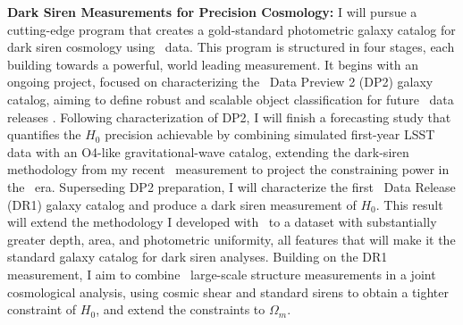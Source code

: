 \textbf{Dark Siren Measurements for Precision Cosmology:}
I will pursue a cutting-edge program that creates a gold-standard photometric galaxy catalog for dark siren cosmology using \LSST\ data.
This program is structured in four stages, each building towards a powerful, world leading measurement.
It begins with an ongoing project, focused on characterizing the \LSST\ Data Preview 2 (DP2) galaxy catalog, aiming to define robust and scalable object classification for future \LSST\ data releases%
.
Following characterization of DP2, I will finish a forecasting study that quantifies the $H_0$ precision achievable by combining simulated first-year LSST data with an O4-like gravitational-wave catalog, extending the dark-siren methodology from my recent \DELVE\ measurement to project the constraining power in the \LSST\ era.
Superseding DP2 preparation, I will characterize the first \LSST\ Data Release (DR1) galaxy catalog and produce a dark siren measurement of $H_0$. This result will extend the methodology I developed with \DELVE\ to a dataset with substantially greater depth, area, and photometric uniformity, all features that will make it the standard galaxy catalog for dark siren analyses.
Building on the DR1 measurement, I aim to combine \LSST\ large-scale structure measurements in a joint cosmological analysis, using cosmic shear and standard sirens to obtain a tighter constraint of $H_0$, and extend the constraints to $\Omega_m$.



